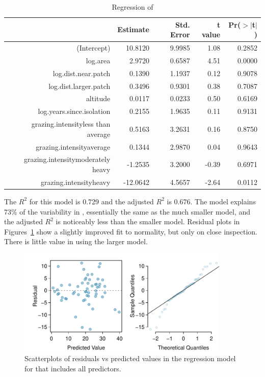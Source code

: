 \begin{table}[ht]
\centering
\begin{tabular}{rrrrr}
  \hline
 & Estimate & Std. Error & t value & Pr($>$$|$t$|$) \\ 
  \hline
(Intercept) & 10.8120 & 9.9985 & 1.08 & 0.2852 \\ 
  log.area & 2.9720 & 0.6587 & 4.51 & 0.0000 \\ 
  log.dist.near.patch & 0.1390 & 1.1937 & 0.12 & 0.9078 \\ 
  log.dist.larger.patch & 0.3496 & 0.9301 & 0.38 & 0.7087 \\ 
  altitude & 0.0117 & 0.0233 & 0.50 & 0.6169 \\ 
  log.years.since.isolation & 0.2155 & 1.9635 & 0.11 & 0.9131 \\ 
  grazing.intensityless than average & 0.5163 & 3.2631 & 0.16 & 0.8750 \\ 
  grazing.intensityaverage & 0.1344 & 2.9870 & 0.04 & 0.9643 \\ 
  grazing.intensitymoderately heavy & -1.2535 & 3.2000 & -0.39 & 0.6971 \\ 
  grazing.intensityheavy & -12.0642 & 4.5657 & -2.64 & 0.0112 \\ 
   \hline
\end{tabular}

\caption{Regression of }
\label{forestbirdsFullModel}
\end{table}

The $R^2$ for this model is 0.729 and the adjusted $R^2$ is 0.676.  The model explains 73\% of the variability in , essentially the same as the  much smaller model, and the adjusted $R^2$ is noticeably less than the smaller model. Residual plots in Figures~\ref{forestbirdsAbunFullModelResidNormPlots} show a slightly improved fit to normality, but only on close inspection. There is little value in using the larger model. 


\begin{figure}[h!]
 	\centering
 	\includegraphics[width=0.9\textwidth]
{ch_multiple_linear_regression_oi_biostat/figures/forestbirdsAbunFullModelResidNormPlots/forestbirdsAbunFullModelResidNormPlots.pdf}
     \caption{Scatterplots of residuals vs predicted values in the regression model for 
      that includes all predictors.}
    	\label{forestbirdsAbunFullModelResidNormPlots}
 \end{figure}

